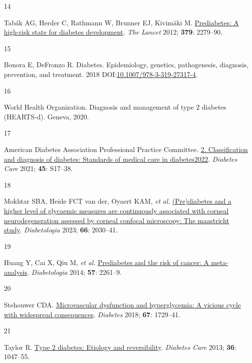 \documentclass[
  a4paper,
  headsepline=true,
  open=any]{scrbook}
\newlength{\cslhangindent}
\newlength{\csllabelwidth}
\newlength{\cslentryspacingunit} %
\newenvironment{CSLReferences}[2] %
 {%
  \setlength{\parindent}{0pt}
  \ifodd #1
  \let\oldpar\par
  \def\par{\hangindent=\cslhangindent\oldpar}
  \fi
  \setlength{\parskip}{#2\cslentryspacingunit}
 }%
 {}
\newcommand{\CSLLeftMargin}[1]{\parbox[t]{\csllabelwidth}{#1}}
\newcommand{\CSLRightInline}[1]{\parbox[t]{\linewidth - \csllabelwidth}{#1}\break}
\begin{document}
\begin{CSLReferences}{0}{0}
\leavevmode{}%
\CSLLeftMargin{14 }%
\CSLRightInline{Tabák AG, Herder C, Rathmann W, Brunner EJ, Kivimäki M.
\href{https://doi.org/10.1016/S0140-6736(12)60283-9}{Prediabetes: A
high-risk state for diabetes development}. \emph{The Lancet} 2012;
\textbf{379}: 2279--90.}

\leavevmode{}%
\CSLLeftMargin{15 }%
\CSLRightInline{Bonora E, DeFronzo R. Diabetes. Epidemiology, genetics,
pathogenesis, diagnosis, prevention, and treatment. 2018
DOI:\href{https://doi.org/10.1007/978-3-319-27317-4}{10.1007/978-3-319-27317-4}.}

\leavevmode{}%
\CSLLeftMargin{16 }%
\CSLRightInline{World Health Organization. Diagnosis and management of
type 2 diabetes (HEARTS-d). Geneva, 2020.}

\leavevmode{}%
\CSLLeftMargin{17 }%
\CSLRightInline{American Diabetes Association Professional Practice
Committee. \href{https://doi.org/10.2337/dc22-S002}{2. Classification
and diagnosis of diabetes: Standards of medical care in
diabetes{\textemdash}2022}. \emph{Diabetes Care} 2021; \textbf{45}:
S17--38.}

\leavevmode{}%
\CSLLeftMargin{18 }%
\CSLRightInline{Mokhtar SBA, Heide FCT van der, Oyaert KAM, \emph{et
al.} \href{https://doi.org/10.1007/s00125-023-05986-5}{(Pre)diabetes and
a higher level of glycaemic measures are continuously associated with
corneal neurodegeneration assessed by corneal confocal microscopy: The
maastricht study}. \emph{Diabetologia} 2023; \textbf{66}: 2030--41.}

\leavevmode{}%
\CSLLeftMargin{19 }%
\CSLRightInline{Huang Y, Cai X, Qiu M, \emph{et al.}
\href{https://doi.org/10.1007/s00125-014-3361-2}{Prediabetes and the
risk of cancer: A meta-analysis}. \emph{Diabetologia} 2014; \textbf{57}:
2261--9.}

\leavevmode{}%
\CSLLeftMargin{20 }%
\CSLRightInline{Stehouwer CDA.
\href{https://doi.org/10.2337/dbi17-0044}{Microvascular dysfunction and
hyperglycemia: A vicious cycle with widespread consequences}.
\emph{Diabetes} 2018; \textbf{67}: 1729--41.}

\leavevmode{}%
\CSLLeftMargin{21 }%
\CSLRightInline{Taylor R. \href{https://doi.org/10.2337/dc12-1805}{Type
2 diabetes: Etiology and reversibility}. \emph{Diabetes Care} 2013;
\textbf{36}: 1047--55.}


\end{CSLReferences}
\end{document}
